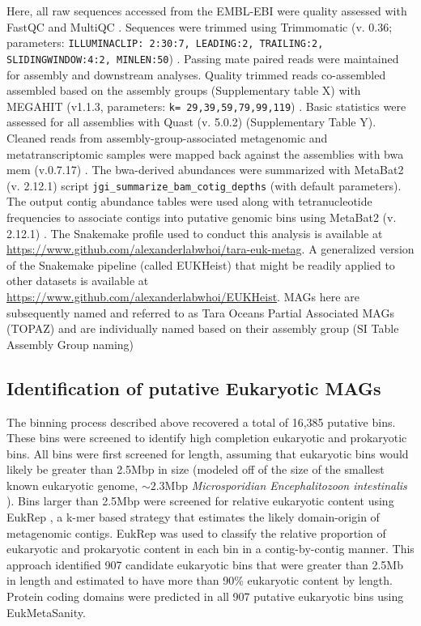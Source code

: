 \documentclass[12pt]{article}
\numberwithin{equation}{section}
\begin{document}
Here, all raw sequences accessed from the EMBL-EBI were quality assessed with FastQC and MultiQC \citep{Andrews2010FastQC}. Sequences were trimmed using Trimmomatic (v. 0.36; parameters: \texttt{ILLUMINACLIP: 2:30:7, LEADING:2, TRAILING:2, SLIDINGWINDOW:4:2, MINLEN:50}) \citep{Bolger2014Trimmomatic}. Passing mate paired reads were maintained for assembly and downstream analyses. Quality trimmed reads co-assembled assembled based on the assembly groups (Supplementary table X) with MEGAHIT (v1.1.3, parameters: \texttt{k= 29,39,59,79,99,119}) \citep{Li2015MEGAHIT}. Basic statistics were assessed for all assemblies with Quast (v. 5.0.2) \citep{Gurevich_2013} (Supplementary Table Y). Cleaned reads from assembly-group-associated metagenomic and metatranscriptomic samples were mapped back against the assemblies with bwa mem (v.0.7.17) \citep{Li2010Fast}. The bwa-derived abundances were summarized with MetaBat2 (v. 2.12.1) script \texttt{jgi\_summarize\_bam\_cotig\_depths} (with default parameters). The output contig abundance tables were used along with tetranucleotide frequencies to associate contigs into putative genomic bins using MetaBat2 (v. 2.12.1) \citep{Kang_2019}. The Snakemake profile used to conduct this analysis is available at \url{https://www.github.com/alexanderlabwhoi/tara-euk-metag}. A generalized version of the Snakemake pipeline (called EUKHeist) that might be readily applied to other datasets is available at \url{https://www.github.com/alexanderlabwhoi/EUKHeist}. MAGs here are subsequently named and referred to as Tara Oceans Partial Associated MAGs (TOPAZ) and are individually named based on their assembly group (SI Table Assembly Group naming)

\subsection*{Identification of putative Eukaryotic MAGs} The binning process described above recovered a total of 16,385 putative bins. These bins were screened to identify high completion eukaryotic and prokaryotic bins. All bins were first screened for length, assuming that eukaryotic bins would likely be greater than 2.5Mbp in size (modeled off of the size of the smallest known eukaryotic genome, $\sim 2.3$Mbp \textit{Microsporidian Encephalitozoon intestinalis} \citep{Corradi2010complete}). Bins larger than 2.5Mbp were screened for relative eukaryotic content using EukRep \citep{West2018Genome-reconstruction}, a k-mer based strategy that estimates the likely domain-origin of metagenomic contigs. EukRep was used to classify the relative proportion of eukaryotic and prokaryotic content in each bin in a contig-by-contig manner. This approach identified 907 candidate eukaryotic bins that were greater than 2.5Mb in length and estimated to have more than 90\% eukaryotic content by length. Protein coding domains were predicted in all 907 putative eukaryotic bins using EukMetaSanity. 
\end{document}
